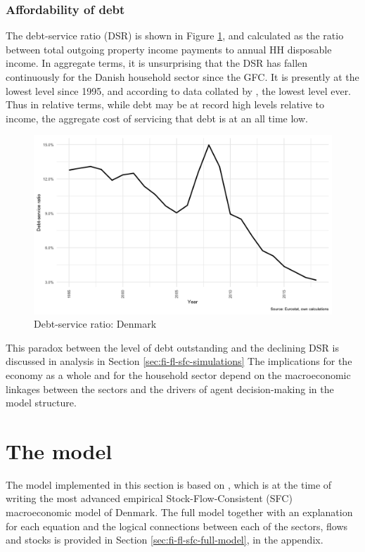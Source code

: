 \documentclass[
]{book}
\begin{document}
\hypertarget{affordability-of-debt}{%
\subsubsection{Affordability of debt}\label{affordability-of-debt}}

The debt-service ratio (DSR) is shown in Figure \ref{fig:debt-service}, and calculated as the ratio between total outgoing property income payments to annual HH disposable income. In aggregate terms, it is unsurprising that the DSR has fallen continuously for the Danish household sector since the GFC. It is presently at the lowest level since 1995, and according to data collated by \citet{abildgren2017}, the lowest level ever. Thus in relative terms, while debt may be at record high levels relative to income, the aggregate cost of servicing that debt is at an all time low.

\begin{figure}[H]
\includegraphics[width=0.6\linewidth]{figures/debt-service-1} \caption{Debt-service ratio: Denmark}\label{fig:debt-service}
\end{figure}

This paradox between the level of debt outstanding and the declining DSR
is discussed in analysis in Section \ref{sec:fi-fl-sfc-simulations} The implications for the
economy as a whole and for the household sector depend on the macroeconomic linkages
between the sectors and the drivers of agent decision-making in the model structure.

\hypertarget{sec:fi-fl-sfc-model-features}{%
\section{The model}\label{sec:fi-fl-sfc-model-features}}

The model implemented in this section is based on \citet{byrialsenraza2019empirical}, which is at the time of writing the most advanced empirical Stock-Flow-Consistent (SFC) macroeconomic model of Denmark. The full model together with an explanation for each equation and the logical connections between each of the sectors, flows and stocks is provided in Section \ref{sec:fi-fl-sfc-full-model}, in the appendix.
\end{document}
